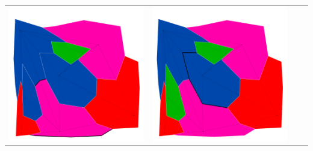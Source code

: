\documentclass[10pt,a4paper]{article}
\begin{document}
\begin{tabular}{c c c c }
	\includegraphics[scale=.10]{../results/min_conflicts/map_build/minconf_I00002.pdf}&
	\includegraphics[scale=.10]{../results/min_conflicts/map_build/minconf_I00003.pdf}&

\end{tabular}
\end{document}
